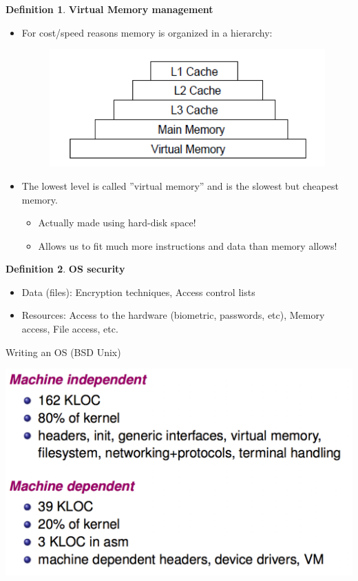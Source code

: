\documentclass[12pt,a4paper]{article}
\theoremstyle{definition}
\newtheorem{definition}{Definition}[section]
\newenvironment{myitemize}
{ \begin{itemize}
    \setlength{\itemsep}{5pt}
    \setlength{\parskip}{0pt}
    \setlength{\parsep}{0pt}     }
{ \end{itemize}                  }
\begin{document}
\begin{definition}{\textbf{Virtual Memory management}}
\begin{myitemize}
	\item For cost/speed reasons memory is organized in a hierarchy:
	\begin{figure}[h!]
		\includegraphics[scale=0.6]{m1/memoryHirarchy}
		\centering
	\end{figure}
	\item The lowest level is called ''virtual memory'' and is the slowest but cheapest memory.
	\begin{myitemize}
	\item Actually made using hard-disk space!
	\item Allows us to fit much more instructions and data than memory allows!
	\end{myitemize}
\end{myitemize}
\end{definition}

\begin{definition}{\textbf{OS security}}
	\begin{myitemize}
		\item Data (files): Encryption techniques, Access control lists
		\item Resources: Access to the hardware (biometric, passwords, etc), Memory access, File access, etc.
	\end{myitemize}
\end{definition}

\begin{tcolorbox}
	\textsf{Writing an OS (BSD Unix)}
	
	\includegraphics[scale=0.3]{m1/writingOS}
	\centering
\end{tcolorbox}
\end{document}
